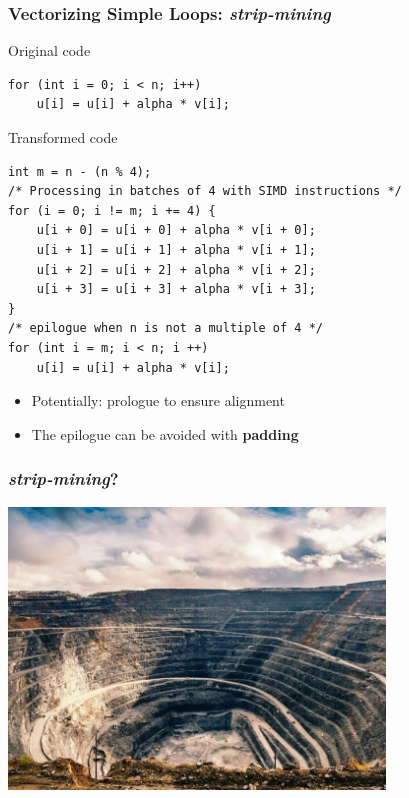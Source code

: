 \documentclass[xcolor={x11names,svgnames}]{beamer}
\begin{document}

\begin{frame}[fragile=singleslide]
  \frametitle{Vectorizing Simple Loops: \textit{strip-mining}}

  \begin{block}{Original code}
  \begin{verbatim}
for (int i = 0; i < n; i++)
    u[i] = u[i] + alpha * v[i];
\end{verbatim}
\end{block}

\begin{exampleblock}{Transformed code}
\begin{verbatim}
int m = n - (n % 4);
/* Processing in batches of 4 with SIMD instructions */
for (i = 0; i != m; i += 4) {
    u[i + 0] = u[i + 0] + alpha * v[i + 0];
    u[i + 1] = u[i + 1] + alpha * v[i + 1];
    u[i + 2] = u[i + 2] + alpha * v[i + 2];
    u[i + 3] = u[i + 3] + alpha * v[i + 3];
}
/* epilogue when n is not a multiple of 4 */
for (int i = m; i < n; i ++)
    u[i] = u[i] + alpha * v[i];
  \end{verbatim}
\end{exampleblock}
\begin{itemize}
\item Potentially: prologue to ensure alignment
\item The epilogue can be avoided with \textbf{padding}
\end{itemize}
\end{frame}


\begin{frame}
  \frametitle{\textit{strip-mining}?}

  \centering
  \includegraphics[width=10cm]{strip_mining.jpg}
\end{frame}
\end{document}
